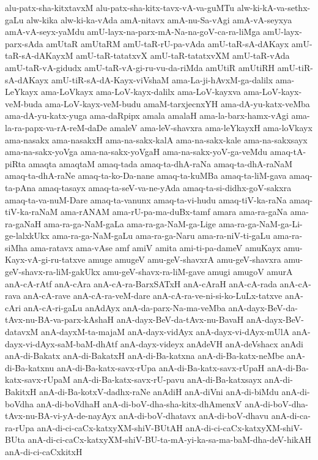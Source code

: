 {alu-patx-sha-kitxtavxM
alu-patx-sha-kitx-tavx-vA-va-guMTu
alw-ki-kA-va-sethx-gaLu
alw-kika
alw-ki-ka-vAda
amA-nitavx
amA-nu-Sa-vAgi
amA-vA-seyxya
amA-vA-seyx-yaMdu
amU-layx-na-parx-mA-Na-na-goV-ca-ra-liMga
amU-layx-parx-sAda
amUtaR
amUtaRM
amU-taR-rU-pa-vAda
amU-taR-sA-dAKayx
amU-taR-sA-dAKayxM
amU-taR-tatatxvX
amU-taR-tatatxvXM
amU-taR-vAda
amU-taR-vA-gidudx
amU-taR-vA-gi-ru-vu-da-riMda
amUtiR
amUtiRH
amU-tiR-sA-dAKayx
amU-tiR-sA-dA-Kayx-viVshaM
ama-La-ji-hAvxM-ga-dalilx
ama-LeYkayx
ama-LoVkayx
ama-LoV-kayx-dalilx
ama-LoV-kayxva
ama-LoV-kayx-veM-buda
ama-LoV-kayx-veM-budu
amaM-tarxjecnxYH
ama-dA-yu-katx-veMba
ama-dA-yu-katx-yuga
ama-daRpipx
amala
amalaH
ama-la-barx-hamx-vAgi
ama-la-ra-papx-va-rA-reM-daDe
amaleV
ama-leV-shavxra
ama-leYkayxH
ama-loVkayx
ama-nasakx
ama-nasakxH
ama-na-sakx-kalA
ama-na-sakx-kale
ama-na-sakxsayx
ama-na-sakx-yoVga
ama-na-sakx-yoVgaH
ama-na-sakx-yoV-ga-veMdu
amaq-tA-piRta
amaqta
amaqtaM
amaq-tada
amaq-ta-dhA-raNa
amaq-ta-dhA-raNaM
amaq-ta-dhA-raNe
amaq-ta-ko-Da-nane
amaq-ta-kuMBa
amaq-ta-liM-gava
amaq-ta-pAna
amaq-tasayx
amaq-ta-seV-va-ne-yAda
amaq-ta-si-didhx-goV-sakxra
amaq-ta-va-nuM-Dare
amaq-ta-vanunx
amaq-ta-vi-hudu
amaq-tiV-ka-raNa
amaq-tiV-ka-raNaM
ama-rANAM
ama-rU-pa-ma-duBx-tamf
amara
ama-ra-gaNa
ama-ra-gaNaH
ama-ra-ga-NaM-gaLa
ama-ra-ga-NaM-ga-Lige
ama-ra-ga-NaM-ga-Li-ge-lalxkUkx
ama-ra-ga-NaM-gaLu
ama-ra-ga-Naru
ama-ra-niV-ti-gaLu
ama-ra-siMha
ama-ratavx
ama-vAse
amf
amiV
amita
ami-ti-pa-dameV
amuKayx
amu-Kayx-vA-gi-ru-tatxve
amuge
amugeV
amu-geV-shavxrA
amu-geV-shavxra
amu-geV-shavx-ra-liM-gakUkx
amu-geV-shavx-ra-liM-gave
amugi
amugoV
amurA
anA-cA-rAtf
anA-cAra
anA-cA-ra-BarxSATxH
anA-cAraH
anA-cA-rada
anA-cA-rava
anA-cA-rave
anA-cA-ra-veM-dare
anA-cA-ra-ve-ni-si-ko-LuLx-tatxve
anA-cAri
anA-cA-ri-gaLu
anAdAyx
anA-da-parx-Na-ma-veMba
anA-dayx-BeV-da-tAvx-nu-BA-va-parx-kAshaH
anA-dayx-BeV-da-tAvx-nu-BavaH
anA-dayx-BeV-datavxM
anA-dayxM-ta-majaM
anA-dayx-vidAyx
anA-dayx-vi-dAyx-mUlA
anA-dayx-vi-dAyx-saM-baM-dhAtf
anA-dayx-videyx
anAdeVH
anA-deVshacx
anAdi
anA-di-Bakatx
anA-di-BakatxH
anA-di-Ba-katxna
anA-di-Ba-katx-neMbe
anA-di-Ba-katxnu
anA-di-Ba-katx-savx-rUpa
anA-di-Ba-katx-savx-rUpaH
anA-di-Ba-katx-savx-rUpaM
anA-di-Ba-katx-savx-rU-pavu
anA-di-Ba-katxsayx
anA-di-BakitxH
anA-di-Ba-kotxV-dadhx-raNe
anAdiH
anA-diVni
anA-di-biMdu
anA-di-boVdha
anA-di-boVdhaH
anA-di-boV-dha-sha-kitx-dhAmenxV
anA-di-boV-dha-tAvx-nu-BA-vi-yA-de-nayAyx
anA-di-boV-dhatavx
anA-di-boV-dhavu
anA-di-ca-ra-rUpa
anA-di-ci-caCx-katxyXM-shiV-BUtAH
anA-di-ci-caCx-katxyXM-shiV-BUta
anA-di-ci-caCx-katxyXM-shiV-BU-ta-mA-yi-ka-sa-ma-baM-dha-deV-hikAH
anA-di-ci-caCxkitxH
}

